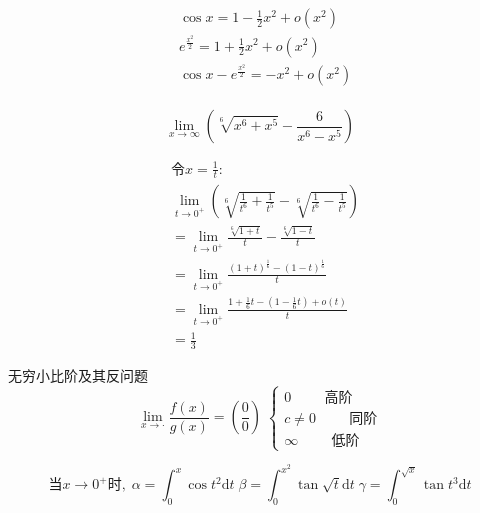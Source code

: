 \documentclass[cn,cyan,fleqn]{elegantbook}
\begin{document}
\begin{solution}
\begin{equation*}
\begin{aligned}
  &\cos x=1-\frac{1}{2}x^2+o(x^2)\\
 & e^{\frac{x^2}{2}}=1+\frac{1}{2}x^2+o(x^2)\\
  &\cos x-e^{\frac{x^2}{2}}=-x^2+o(x^2)\\
\end{aligned}
\end{equation*}
\end{solution}
\begin{problem}
\begin{equation*}
  \lim\limits_{x\to \infty}(\sqrt[6]{x^6+x^5}-\frac{6}{x^6-x^5})
\end{equation*}
\end{problem}
\begin{solution}
\begin{equation*}
\begin{aligned}
 & \mbox{令}x=\frac{1}{t}:\\
 & \lim\limits_{t\to 0^+}(\sqrt[6]{\frac{1}{t^6}+\frac{1}{t^5}}-\sqrt[6]{\frac{1}{t^6}-\frac{1}{t^5}})\\
 & =\lim\limits_{t\to 0^+}\frac{\sqrt[6]{1+t}}{t}-\frac{\sqrt[6]{1-t}}{t}\\
  &=\lim\limits_{t\to 0^+}\frac{(1+t)^\frac{1}{6}-(1-t)^\frac{1}{6}}{t}\\
 & =\lim\limits_{t\to 0^+}\frac{1+\frac{1}{6}t-(1-\frac{1}{6}t)+o(t)}{t}\\
  &=\frac{1}{3}
\end{aligned}
\end{equation*}
\end{solution}
\textcolor{third}{无穷小比阶及其反问题}\\
\[\lim\limits_{x\to\cdot}\frac{f(x)}{g(x)}=(\frac{0}{0})\;\left\{ \begin{array}{l}0 \hspace{1cm}\mbox{高阶}\\
                                                                                c\neq 0\hspace{1cm}\mbox{同阶}\\
                                                                            \infty\hspace{1cm}\mbox{低阶}\end{array}\right.\]
\begin{problem}
\begin{equation}\nonumber
  \mbox{当}x\to 0^+\mbox{时}, \; \alpha=\int_{0}^{x}\cos t^2\text{d}t \; \beta=\int_{0}^{x^2}\tan \sqrt{t}\text{d}t \; \gamma=\int_{0}^{\sqrt{x}}\tan t^3\text{d}t
\end{equation}
\end{problem}
\end{document}
